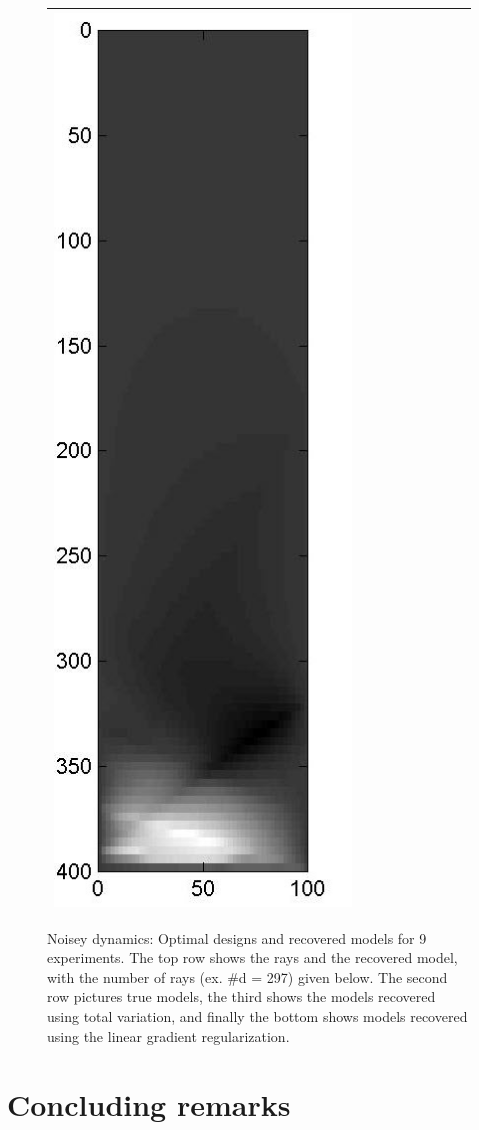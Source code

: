 \documentclass[11pt]{article}
\begin{document}
\begin{figure}[!h]
\begin{center}
\begin{tabular}{|c|c|c|c|c|c|c|c|c|}
			\includegraphics[width=.9\iwidth]{figures/newFigs/noisy/resultsExp-9-mk}		
			\\			
			\hline
		\end{tabular}
	\end{center}
	\caption{Noisey dynamics: Optimal designs and recovered models for 9 experiments. The top row shows the rays and the recovered model, with the number of rays (ex. \#d = 297) given below. The second row pictures true models, the third shows the  models recovered using total variation, and finally the bottom shows models recovered using the linear gradient regularization.}
	\label{fig:results1}
\end{figure}


\section{Concluding remarks}


%
\end{document}
